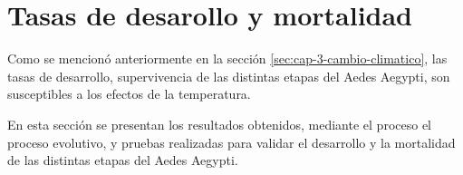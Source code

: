 \section{Tasas de desarollo y mortalidad}

Como se mencionó anteriormente en la sección \ref{sec:cap-3-cambio-climatico}, las tasas de desarrollo,
supervivencia de las distintas etapas del Aedes Aegypti, son susceptibles a los efectos de la 
temperatura. 

En esta sección se presentan los resultados obtenidos, mediante el proceso el proceso evolutivo, y 
pruebas realizadas para validar el desarrollo y la mortalidad de las distintas etapas del Aedes Aegypti.




